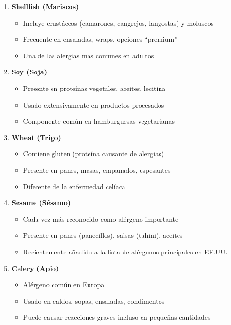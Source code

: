 \documentclass[12pt,a4paper]{article}
\begin{document}
\begin{enumerate}
    \item \textbf{Shellfish (Mariscos)}
    \begin{itemize}
        \item Incluye crustáceos (camarones, cangrejos, langostas) y moluscos
        \item Frecuente en ensaladas, wraps, opciones ``premium''
        \item Una de las alergias más comunes en adultos
    \end{itemize}
    
    \item \textbf{Soy (Soja)}
    \begin{itemize}
        \item Presente en proteínas vegetales, aceites, lecitina
        \item Usado extensivamente en productos procesados
        \item Componente común en hamburguesas vegetarianas
    \end{itemize}
    
    \item \textbf{Wheat (Trigo)}
    \begin{itemize}
        \item Contiene gluten (proteína causante de alergias)
        \item Presente en panes, masas, empanados, espesantes
        \item Diferente de la enfermedad celíaca
    \end{itemize}
    
    \item \textbf{Sesame (Sésamo)}
    \begin{itemize}
        \item Cada vez más reconocido como alérgeno importante
        \item Presente en panes (panecillos), salsas (tahini), aceites
        \item Recientemente añadido a la lista de alérgenos principales en EE.UU.
    \end{itemize}
    
    \item \textbf{Celery (Apio)}
    \begin{itemize}
        \item Alérgeno común en Europa
        \item Usado en caldos, sopas, ensaladas, condimentos
        \item Puede causar reacciones graves incluso en pequeñas cantidades
    \end{itemize}
\end{enumerate}
\end{document}
